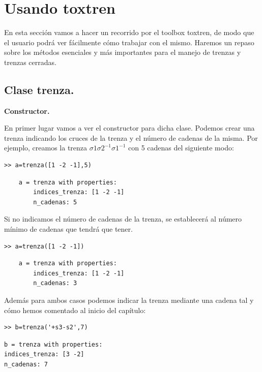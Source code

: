 \newpage
\section{Usando toxtren}
En esta sección vamos a hacer un recorrido por el toolbox toxtren, de modo que el usuario podrá ver fácilmente cómo trabajar con el mismo. Haremos un repaso sobre los métodos esenciales y más importantes para el manejo de trenzas y trenzas cerradas. \\
 

\subsection{Clase trenza.}

\begin{center}
	\textbf{Constructor.}
\end{center}
En primer lugar vamos a ver el constructor para dicha clase. Podemos crear una trenza indicando los cruces de la trenza y el número de cadenas de la misma. Por ejemplo, creamos la trenza $\sigma1\sigma2^{-1}\sigma1^{-1}$ con 5 cadenas del siguiente modo:
	\lstset{language=Matlab, breaklines=true, basicstyle=\ttfamily\small}
\begin{lstlisting}
>> a=trenza([1 -2 -1],5)
\end{lstlisting}
\begin{lstlisting}
	a = trenza with properties:
	    indices_trenza: [1 -2 -1]
	    n_cadenas: 5
\end{lstlisting}

Si no indicamos el número de cadenas de la trenza, se establecerá al número mínimo de cadenas que tendrá que tener. 
\begin{lstlisting}
>> a=trenza([1 -2 -1])
\end{lstlisting}
\begin{lstlisting}
	a = trenza with properties:
	    indices_trenza: [1 -2 -1]
	    n_cadenas: 3
\end{lstlisting}

Además para ambos casos podemos indicar la trenza mediante una cadena tal y cómo hemos comentado al inicio del capítulo:

\begin{lstlisting}
>> b=trenza('+s3-s2',7)
\end{lstlisting}
\begin{lstlisting}
b = trenza with properties:
indices_trenza: [3 -2]
n_cadenas: 7
\end{lstlisting}

